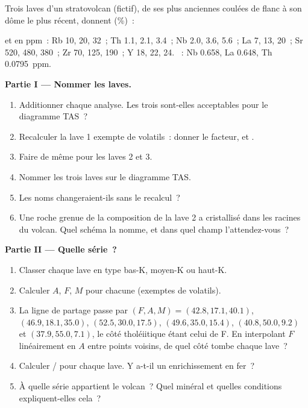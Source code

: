 \begin{problem}
\label{pb:b2:magmatic-series:1}
Trois laves d'un stratovolcan (fictif), de ses plus anciennes coulées de flanc à son dôme le plus
récent, donnent (\unit{\percent})~:

\smallskip{}

\smallskip\noindent et en ppm~: Rb 10, 20, 32~; Th 1.1, 2.1, 3.4~; Nb 2.0, 3.6, 5.6~;
La 7, 13, 20~; Sr 520, 480, 380~; Zr 70, 125, 190~; Y 18, 22, 24. ~: Nb
0.658, La 0.648, Th \qty{0.0795}{ppm}.

\noindent\textbf{Partie I --- Nommer les laves.}
\begin{enumerate}
\item Additionner chaque analyse. Les trois sont-elles acceptables pour le diagramme TAS~?
\item Recalculer la lave 1 exempte de volatils~: donner le facteur,  et
.
\item Faire de même pour les laves 2 et 3.
\item Nommer les trois laves sur le diagramme TAS.
\item Les noms changeraient-ils sans le recalcul~?
\item Une roche grenue de la composition de la lave 2 a cristallisé dans les racines
du volcan. Quel schéma la nomme, et dans quel champ l'attendez-vous~?
\end{enumerate}

\noindent\textbf{Partie II --- Quelle série~?}
\begin{enumerate}[resume]
\item Classer chaque lave en type bas-K, moyen-K ou haut-K.
\item Calculer $A$, $F$, $M$ pour chacune (exemptes de volatils).
\item La ligne de partage passe par $(F, A, M) = (42.8, 17.1, 40.1)$, $(46.9, 18.1,
35.0)$, $(52.5, 30.0, 17.5)$, $(49.6, 35.0, 15.4)$, $(40.8, 50.0, 9.2)$ et $(37.9,
55.0, 7.1)$, le côté tholéiitique étant celui de F. En interpolant $F$ linéairement en
$A$ entre points voisins, de quel côté tombe chaque lave~?
\item Calculer / pour chaque lave. Y a-t-il un enrichissement en fer~?
\item À quelle série appartient le volcan~? Quel minéral et quelles conditions
expliquent-elles cela~?
\end{enumerate}


\end{problem}
